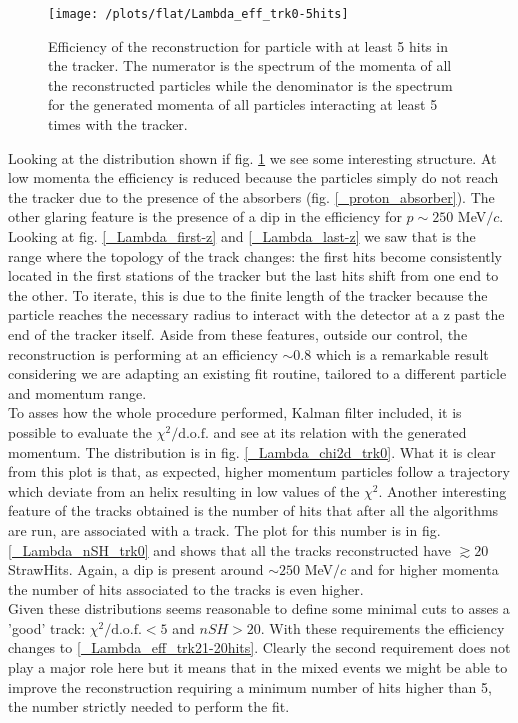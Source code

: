 \documentclass[12pt,a4paper,openright, oneside, titlepage]{book} %
\begin{document}
\begin{figure}[h!]
\centering
\texttt{[image: /plots/flat/Lambda\_eff\_trk0-5hits]}
\caption{Efficiency of the reconstruction for particle with at least 5 hits in the tracker. The numerator is the spectrum of the momenta of all the reconstructed particles while the denominator is the spectrum for the generated momenta of all particles interacting at least 5 times with the tracker.}
\label{_Lambda_eff_trk0-5hits}
\end{figure}

\noindent Looking at the distribution shown if fig. \ref{_Lambda_eff_trk0-5hits} we see some interesting structure. At low momenta the efficiency is reduced because the particles simply do not reach the tracker due to the presence of the absorbers (fig. \ref{_proton_absorber}). 
The other glaring feature is the presence of a dip in the efficiency for $p\sim250$ MeV$/c$. 
Looking at fig. \ref{_Lambda_first-z} and \ref{_Lambda_last-z} we saw that is the range where the topology of the track changes: the first hits become consistently located in the first stations of the tracker but the last hits shift from one end to the other. 
To iterate, this is due to the finite length of the tracker because the particle reaches the necessary radius to interact with the detector at a z past the end of the tracker itself.
Aside from these features, outside our control, the reconstruction is performing at an efficiency $\sim 0.8$ which is a remarkable result considering we are adapting an existing fit routine, tailored to a different particle and momentum range.\\
To asses how the whole procedure performed, Kalman filter included, it is possible to evaluate the $\chi^2/\textrm{d.o.f.}$ and see at its relation with the generated momentum. The distribution is in fig. \ref{_Lambda_chi2d_trk0}. What it is clear from this plot is that, as expected, higher momentum particles follow a trajectory which deviate from an helix resulting in low values of the $\chi^2$. 
Another interesting feature of the tracks obtained is the number of hits that after all the algorithms are run, are associated with a track. The plot for this number is in fig. \ref{_Lambda_nSH_trk0} and shows that all the tracks reconstructed have $\gtrsim 20$ StrawHits. Again, a dip is present around $\sim 250$ MeV$/c$ and for higher momenta the number of hits associated to the tracks is even higher.\\
Given these distributions seems reasonable to define some minimal cuts to asses a 'good' track: $\chi^2/\textrm{d.o.f.}<5$ and $nSH>20$.
With these requirements the efficiency changes to \ref{_Lambda_eff_trk21-20hits}.
Clearly the second requirement does not play a major role here but it means that in the mixed events we might be able to improve the reconstruction requiring a minimum number of hits higher than 5, the number strictly needed to perform the fit.
\end{document}
